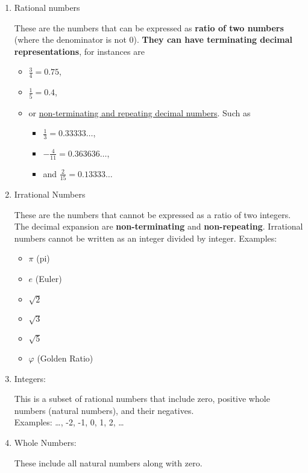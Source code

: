 \documentclass{article}
\begin{document}
\begin{enumerate}

    \item Rational numbers \par 
    These are the numbers that can be expressed as
    \textbf{ratio of two numbers} (where the denominator is not 0).
    \textbf{They can have terminating decimal representations},
    for instances are
    \begin{itemize}
        \item $\frac{3}{4} = 0.75$,
        \item $\frac{1}{5} = 0.4$,
        \item or \underline{non-terminating and repeating decimal numbers}.
        Such as
        \begin{itemize}
            \item $\frac{1}{3} = 0.33333\dots$,
            \item $- \frac{4}{11} = 0.363636\dots$,
            \item and $\frac{2}{15} = 0.13333\dots$
        \end{itemize}
    \end{itemize}

    \item Irrational Numbers \par
    These are the numbers that cannot be expressed as a ratio of two integers.
    The decimal expansion are \textbf{non-terminating} and \textbf{non-repeating}.
    Irrational numbers cannot be written as an integer divided by integer.
    Examples:
    \begin{itemize}
        \item $\pi$ (pi)
        \item $e$ (Euler)
        \item $\sqrt{2}$
        \item $\sqrt{3}$
        \item $\sqrt{5}$
        \item $\varphi$ (Golden Ratio)
    \end{itemize}

    \item Integers: \par
    This is a subset of rational numbers that include zero,
    positive whole numbers (natural numbers), and their negatives. \\
    Examples: \dots, -2, -1, 0, 1, 2, \dots

    \item Whole Numbers: \par
    These include all natural numbers along with zero.


\end{enumerate}
\end{document}

